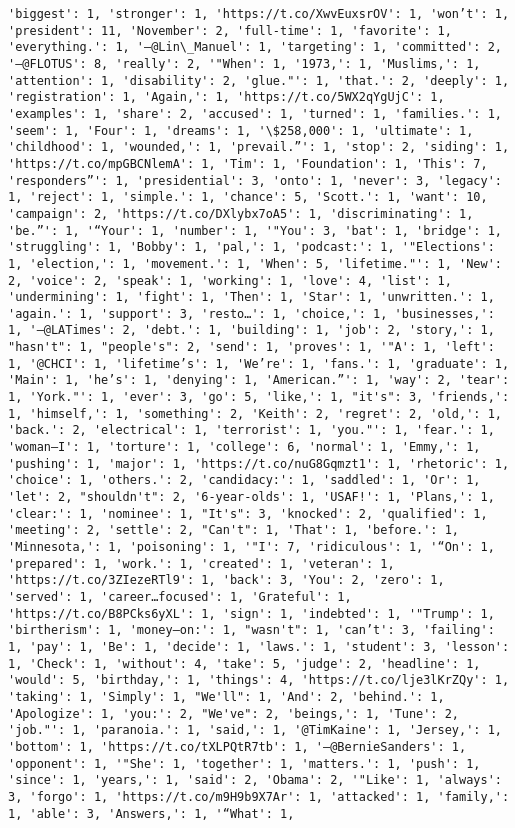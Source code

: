 \documentclass[11pt]{article}
\begin{document}
\begin{Verbatim}[commandchars=\\\{\}]
'biggest': 1, 'stronger': 1, 'https://t.co/XwvEuxsrOV': 1, 'won’t': 1, 'president': 11, 'November': 2, 'full-time': 1, 'favorite': 1, 'everything.': 1, '—@Lin\_Manuel': 1, 'targeting': 1, 'committed': 2, '—@FLOTUS': 8, 'really': 2, '"When': 1, '1973,': 1, 'Muslims,': 1, 'attention': 1, 'disability': 2, 'glue."': 1, 'that.': 2, 'deeply': 1, 'registration': 1, 'Again,': 1, 'https://t.co/5WX2qYgUjC': 1, 'examples': 1, 'share': 2, 'accused': 1, 'turned': 1, 'families.': 1, 'seem': 1, 'Four': 1, 'dreams': 1, '\$258,000': 1, 'ultimate': 1, 'childhood': 1, 'wounded,': 1, 'prevail.”': 1, 'stop': 2, 'siding': 1, 'https://t.co/mpGBCNlemA': 1, 'Tim': 1, 'Foundation': 1, 'This': 7, 'responders”': 1, 'presidential': 3, 'onto': 1, 'never': 3, 'legacy': 1, 'reject': 1, 'simple.': 1, 'chance': 5, 'Scott.': 1, 'want': 10, 'campaign': 2, 'https://t.co/DXlybx7oA5': 1, 'discriminating': 1, 'be.”': 1, '“Your': 1, 'number': 1, '"You': 3, 'bat': 1, 'bridge': 1, 'struggling': 1, 'Bobby': 1, 'pal,': 1, 'podcast:': 1, '"Elections': 1, 'election,': 1, 'movement.': 1, 'When': 5, 'lifetime."': 1, 'New': 2, 'voice': 2, 'speak': 1, 'working': 1, 'love': 4, 'list': 1, 'undermining': 1, 'fight': 1, 'Then': 1, 'Star': 1, 'unwritten.': 1, 'again.': 1, 'support': 3, 'resto…': 1, 'choice,': 1, 'businesses,': 1, '—@LATimes': 2, 'debt.': 1, 'building': 1, 'job': 2, 'story,': 1, "hasn't": 1, "people's": 2, 'send': 1, 'proves': 1, '"A': 1, 'left': 1, '@CHCI': 1, 'lifetime’s': 1, 'We’re': 1, 'fans.': 1, 'graduate': 1, 'Main': 1, 'he’s': 1, 'denying': 1, 'American.”': 1, 'way': 2, 'tear': 1, 'York."': 1, 'ever': 3, 'go': 5, 'like,': 1, "it's": 3, 'friends,': 1, 'himself,': 1, 'something': 2, 'Keith': 2, 'regret': 2, 'old,': 1, 'back.': 2, 'electrical': 1, 'terrorist': 1, 'you."': 1, 'fear.': 1, 'woman—I': 1, 'torture': 1, 'college': 6, 'normal': 1, 'Emmy,': 1, 'pushing': 1, 'major': 1, 'https://t.co/nuG8Gqmzt1': 1, 'rhetoric': 1, 'choice': 1, 'others.': 2, 'candidacy:': 1, 'saddled': 1, 'Or': 1, 'let': 2, "shouldn't": 2, '6-year-olds': 1, 'USAF!': 1, 'Plans,': 1, 'clear:': 1, 'nominee': 1, "It's": 3, 'knocked': 2, 'qualified': 1, 'meeting': 2, 'settle': 2, "Can't": 1, 'That': 1, 'before.': 1, 'Minnesota,': 1, 'poisoning': 1, '"I': 7, 'ridiculous': 1, '“On': 1, 'prepared': 1, 'work.': 1, 'created': 1, 'veteran': 1, 'https://t.co/3ZIezeRTl9': 1, 'back': 3, 'You': 2, 'zero': 1, 'served': 1, 'career…focused': 1, 'Grateful': 1, 'https://t.co/B8PCks6yXL': 1, 'sign': 1, 'indebted': 1, '"Trump': 1, 'birtherism': 1, 'money—on:': 1, "wasn't": 1, 'can’t': 3, 'failing': 1, 'pay': 1, 'Be': 1, 'decide': 1, 'laws.': 1, 'student': 3, 'lesson': 1, 'Check': 1, 'without': 4, 'take': 5, 'judge': 2, 'headline': 1, 'would': 5, 'birthday,': 1, 'things': 4, 'https://t.co/lje3lKrZQy': 1, 'taking': 1, 'Simply': 1, "We'll": 1, 'And': 2, 'behind.': 1, 'Apologize': 1, 'you:': 2, "We've": 2, 'beings,': 1, 'Tune': 2, 'job."': 1, 'paranoia.': 1, 'said,': 1, '@TimKaine': 1, 'Jersey,': 1, 'bottom': 1, 'https://t.co/tXLPQtR7tb': 1, '—@BernieSanders': 1, 'opponent': 1, '"She': 1, 'together': 1, 'matters.': 1, 'push': 1, 'since': 1, 'years,': 1, 'said': 2, 'Obama': 2, '"Like': 1, 'always': 3, 'forgo': 1, 'https://t.co/m9H9b9X7Ar': 1, 'attacked': 1, 'family,': 1, 'able': 3, 'Answers,': 1, '“What': 1, 
\end{Verbatim}
\end{document}
